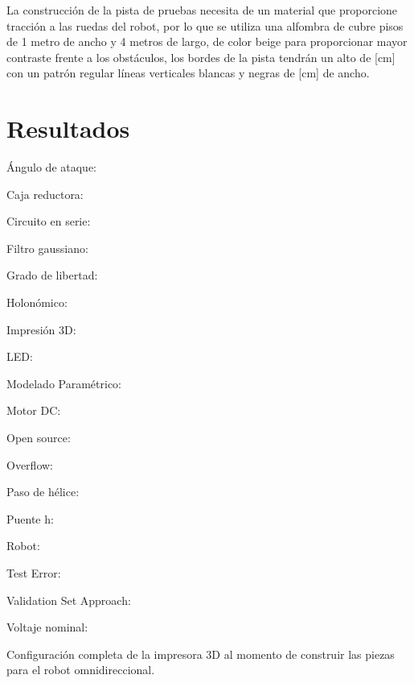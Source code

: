 \documentclass{iccmemoria}
\begin{document}
La construcción de la pista de pruebas necesita de un material que proporcione tracción a las ruedas del robot, por lo que se utiliza una alfombra de cubre pisos de 1 metro de ancho y 4 metros de largo, de color beige para proporcionar mayor contraste frente a los obstáculos, los bordes de la pista tendrán un alto de [cm] con un patrón regular líneas verticales blancas y negras de [cm] de ancho.

\chapter{Resultados}




\begin{glosario}
	\item[Ángulo de ataque:]
	\item[Caja reductora:]
	\item[Circuito en serie:]
	\item[Filtro gaussiano:]
	\item[Grado de libertad:]
	\item[Holonómico:]
	\item[Impresión 3D:]
	\item[LED:]
	\item[Modelado Paramétrico:]
	\item[Motor DC:]
	\item[Open source:]
	\item[Overflow:]
	\item[Paso de hélice:]
	\item[Puente h:]
	\item[Robot:]
	\item[Test Error:]
	\item[Validation Set Approach:]
	\item[Voltaje nominal:]
\end{glosario}





\appendixpart

\label{appendix:3D printer setting}
Configuración completa de la impresora 3D al momento de construir las piezas para el robot omnidireccional.
\end{document}
